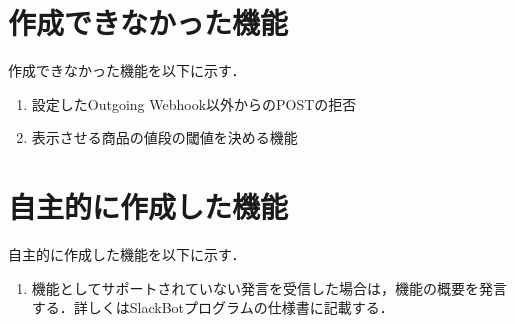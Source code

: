 \documentclass[12pt]{jsarticle}
\begin{document}
\section{作成できなかった機能}
作成できなかった機能を以下に示す．
\begin{enumerate}
  \item 設定したOutgoing Webhook以外からのPOSTの拒否
  \item 表示させる商品の値段の閾値を決める機能
\end{enumerate}

\section{自主的に作成した機能}
自主的に作成した機能を以下に示す．
\begin{enumerate}
  \item 機能としてサポートされていない発言を受信した場合は，機能の概要を発言する．詳しくはSlackBotプログラムの仕様書に記載する．
\end{enumerate}



\end{document}
